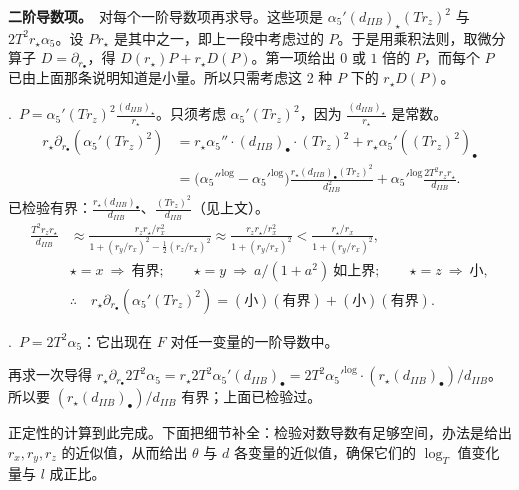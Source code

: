 \noindent\textbf{二阶导数项。}\ 对每个一阶导数项再求导。这些项是 $\alpha_5'(d_{IIB})_\star(Tr_z)^2$ 与 $2T^2r_\star\alpha_5$。设 $Pr_\star$ 是其中之一，即上一段中考虑过的 $P$。于是用乘积法则，取微分算子 $D=\partial_{r_\bullet}$，得 $D(r_\star)P+r_\star D(P)$。第一项给出 $0$ 或 $1$ 倍的 $P$，而每个 $P$ 已由上面那条说明知道是小量。所以只需考虑这 2 种 $P$ 下的 $r_\star D(P)$。

\medskip
{}.\ $P=\alpha_5'(Tr_z)^2\frac{(d_{IIB})_\star}{r_\star}$。只须考虑 $\alpha_5'(Tr_z)^2$，因为 $\frac{(d_{IIB})_\star}{r_\star}$ 是常数。
\begin{align*}
r_\star\partial_{r_\bullet}(\alpha_5'(Tr_z)^2)
&=r_\star\alpha_5''\cdot(d_{IIB})_\bullet\cdot(Tr_z)^2+r_\star\alpha_5'((Tr_z)^2)_\bullet\\
&=\big({\alpha_5''}^{\log}-{\alpha_5'}^{\log}\big)\frac{r_\star(d_{IIB})_\bullet(Tr_z)^2}{d_{IIB}^2}
+{\alpha_5'}^{\log}\frac{2T^2r_zr_\star}{d_{IIB}}.
\end{align*}
已检验有界：$\frac{r_\star(d_{IIB})_\bullet}{d_{IIB}}$、$\frac{(Tr_z)^2}{d_{IIB}}$（见上文）。
\begin{align*}
\frac{T^2r_zr_\star}{d_{IIB}}
&\approx\frac{r_zr_\star/r_x^2}{1+(r_y/r_x)^2-\frac12(r_z/r_x)^2}
\approx\frac{r_zr_\star/r_x^2}{1+(r_y/r_x)^2}<\frac{r_\star/r_x}{1+(r_y/r_x)^2},\\
&\star=x\ \Longrightarrow\ \text{有界};\qquad
\star=y\ \Longrightarrow\ a/(1+a^2)\ \text{如上界};\qquad
\star=z\ \Longrightarrow\ \text{小},\\
&\therefore\quad r_\star\partial_{r_\bullet}(\alpha_5'(Tr_z)^2)=(\text{小})(\text{有界})+(\text{小})(\text{有界}).
\end{align*}

\medskip
{}.\ $P=2T^2\alpha_5$：它出现在 $F$ 对任一变量的一阶导数中。

再求一次导得 $r_\star\partial_{r_\bullet}2T^2\alpha_5=r_\star2T^2\alpha_5'(d_{IIB})_\bullet=2T^2{\alpha_5'}^{\log}\cdot(r_\star(d_{IIB})_\bullet)/d_{IIB}$。所以要 $(r_\star(d_{IIB})_\bullet)/d_{IIB}$ 有界；上面已检验过。

正定性的计算到此完成。下面把细节补全：检验对数导数有足够空间，办法是给出 $r_x,r_y,r_z$ 的近似值，从而给出 $\theta$ 与 $d$ 各变量的近似值，确保它们的 $\log_T$ 值变化量与 $l$ 成正比。


